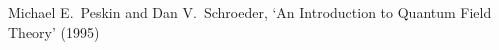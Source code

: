 \documentclass{report}
\begin{document}
\maketitle
\tableofcontents
\newpage





















\begin{thebibliography}{99}

 Michael E.~Peskin and Dan V.~Schroeder, `An Introduction to Quantum Field Theory' (1995)

\end{thebibliography}
\end{document}
